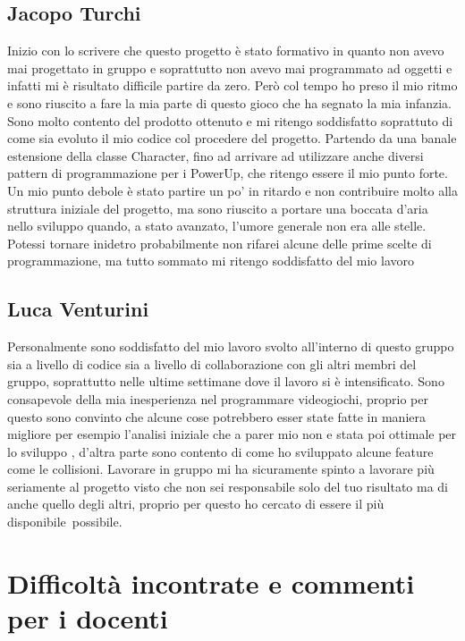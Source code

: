 \documentclass[a4paper,12pt]{report}
\begin{document}
\subsection{Jacopo Turchi}
\par
Inizio con lo scrivere che questo progetto è stato formativo in quanto non avevo mai progettato in gruppo e soprattutto non avevo mai programmato ad oggetti e infatti mi è risultato difficile partire da zero. Però col tempo ho preso il mio ritmo e sono riuscito a fare la mia parte di questo gioco che ha segnato la mia infanzia. Sono molto contento del prodotto ottenuto e mi ritengo soddisfatto soprattuto di come sia evoluto il mio codice col procedere del progetto. Partendo da una banale estensione della classe Character, fino ad arrivare ad utilizzare anche diversi pattern di programmazione per i PowerUp, che ritengo essere il mio punto forte. Un mio punto debole è stato partire un po' in ritardo e non contribuire molto alla struttura iniziale del progetto, ma sono riuscito a portare una boccata d'aria nello sviluppo quando, a stato avanzato, l'umore generale non era alle stelle. Potessi tornare inidetro probabilmente non rifarei alcune delle prime scelte di programmazione, ma tutto sommato mi ritengo soddisfatto del mio lavoro

\subsection{Luca Venturini}
\par
Personalmente sono soddisfatto del mio lavoro svolto all'interno di questo gruppo sia a livello di codice sia a livello di collaborazione con gli altri membri del gruppo, soprattutto nelle ultime settimane dove il lavoro si è intensificato. Sono consapevole della mia inesperienza nel programmare videogiochi, proprio per questo sono convinto che alcune cose potrebbero esser state fatte in maniera migliore per esempio l'analisi iniziale che a parer mio non e stata poi ottimale per lo sviluppo , d'altra parte sono contento di come ho sviluppato alcune feature come le collisioni.
Lavorare in gruppo mi ha sicuramente spinto a lavorare più seriamente al progetto visto che non sei responsabile solo del tuo risultato ma di anche quello degli altri, proprio per questo ho cercato di essere il più disponibile possibile.

\section{Difficoltà incontrate e commenti per i docenti}
\end{document}
